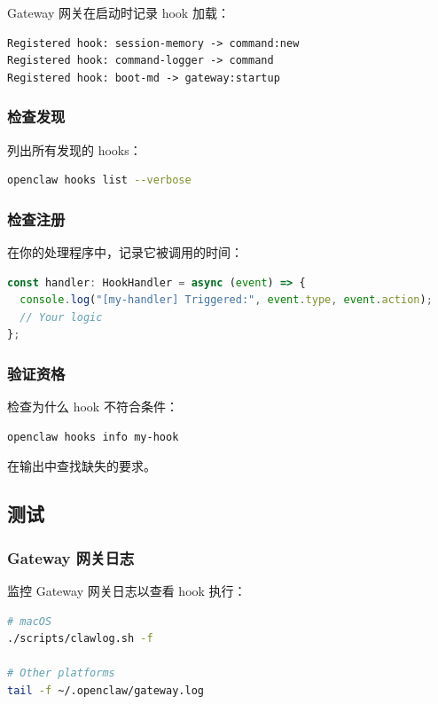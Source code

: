 Gateway 网关在启动时记录 hook 加载：

\begin{lstlisting}
Registered hook: session-memory -> command:new
Registered hook: command-logger -> command
Registered hook: boot-md -> gateway:startup
\end{lstlisting}


\subsubsection{检查发现}


列出所有发现的 hooks：

\begin{lstlisting}[language=bash]
openclaw hooks list --verbose
\end{lstlisting}


\subsubsection{检查注册}


在你的处理程序中，记录它被调用的时间：

\begin{lstlisting}[language=typescript]
const handler: HookHandler = async (event) => {
  console.log("[my-handler] Triggered:", event.type, event.action);
  // Your logic
};
\end{lstlisting}


\subsubsection{验证资格}


检查为什么 hook 不符合条件：

\begin{lstlisting}[language=bash]
openclaw hooks info my-hook
\end{lstlisting}


在输出中查找缺失的要求。

\subsection{测试}


\subsubsection{Gateway 网关日志}


监控 Gateway 网关日志以查看 hook 执行：

\begin{lstlisting}[language=bash]
# macOS
./scripts/clawlog.sh -f

# Other platforms
tail -f ~/.openclaw/gateway.log
\end{lstlisting}


